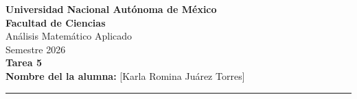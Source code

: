 \documentclass[12pt,letterpaper]{article}
\begin{document}
\begin{center}
    {\Large \textbf{Universidad Nacional Autónoma de México}} \\[0.2cm] %
    {\large \textbf{Facultad de Ciencias}} \\[0.5cm] %
    {\large Análisis Matemático Aplicado} \\[0.2cm] %
    {\large Semestre 2026} \\[0.8cm] %
    {\Large \textbf{Tarea 5}} \\[0.5cm] %
    {\large \textbf{Nombre del la alumna:} [Karla Romina Juárez Torres]} \\[0.5cm]
\end{center}

\hrule
\vspace{1cm}










\end{document}
